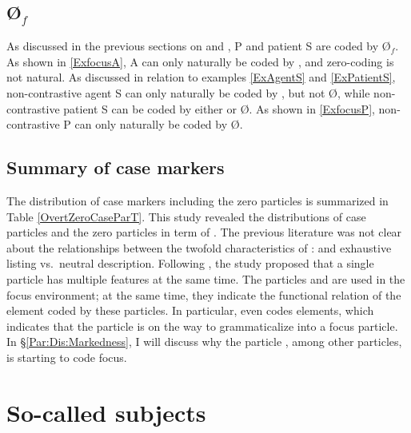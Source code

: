 
\subsection{{\O$_{f}$}}\label{FocZero}

As discussed in the previous sections on  and ,
 P and patient S are coded by {\O$_{f}$}.
As shown in \ref{ExfocusA},
 A can only naturally be coded by ,
and zero-coding is not natural.
As discussed in relation to examples \ref{ExAgentS} and \ref{ExPatientS},
non-contrastive agent S can only naturally be coded by , but not {\O},
while non-contrastive patient S can be coded by either  or {\O}.
As shown in \ref{ExfocusP},
non-contrastive P can only naturally be coded by {\O}.

\subsection{Summary of case markers}

The distribution of case markers including the zero particles is summarized in Table \ref{OvertZeroCaseParT}.
This study revealed the distributions of case particles and the zero particles in term of .
The previous literature was not clear about the relationships between the twofold characteristics of :
 and exhaustive listing vs.~neutral description.
Following ,
the study proposed that
a single particle has multiple features at the same time.
The particles  and  are used in the focus environment;
at the same time, they indicate the functional relation of the element coded by these particles.
In particular,  even codes  elements,
which indicates that the particle is on the way to grammaticalize into a focus particle.
In \S \ref{Par:Dis:Markedness},
I will discuss why the particle , among other particles,
is starting to code focus.

\section{So-called subjects}\label{Par:ArgStr}

